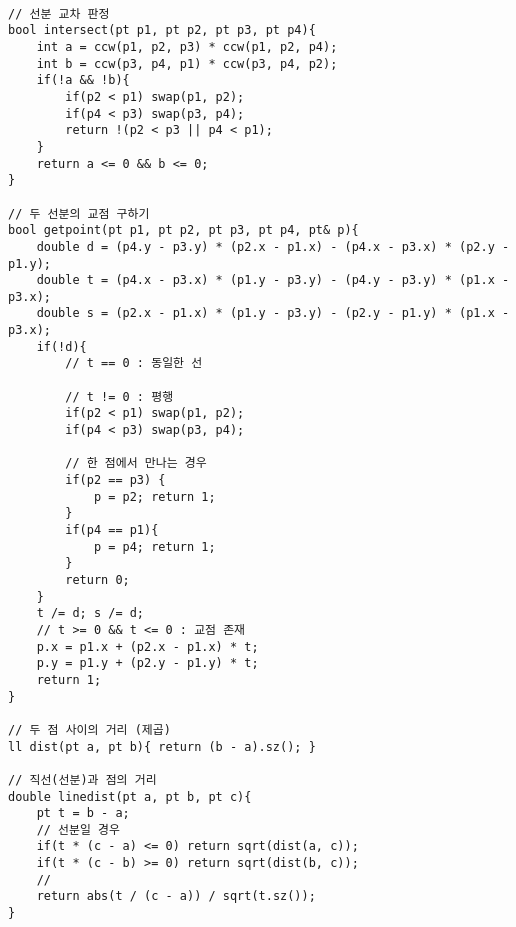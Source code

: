 \documentclass[landscape, 8pt, a4paper, oneside, twocolumn]{extarticle}
\begin{document}
\begin{verbatim}

// 선분 교차 판정
bool intersect(pt p1, pt p2, pt p3, pt p4){
    int a = ccw(p1, p2, p3) * ccw(p1, p2, p4);
    int b = ccw(p3, p4, p1) * ccw(p3, p4, p2);
    if(!a && !b){
        if(p2 < p1) swap(p1, p2);
        if(p4 < p3) swap(p3, p4);
        return !(p2 < p3 || p4 < p1);
    }
    return a <= 0 && b <= 0;
}

// 두 선분의 교점 구하기
bool getpoint(pt p1, pt p2, pt p3, pt p4, pt& p){
    double d = (p4.y - p3.y) * (p2.x - p1.x) - (p4.x - p3.x) * (p2.y - p1.y);
    double t = (p4.x - p3.x) * (p1.y - p3.y) - (p4.y - p3.y) * (p1.x - p3.x);
    double s = (p2.x - p1.x) * (p1.y - p3.y) - (p2.y - p1.y) * (p1.x - p3.x);
    if(!d){
        // t == 0 : 동일한 선
        
        // t != 0 : 평행
        if(p2 < p1) swap(p1, p2);
        if(p4 < p3) swap(p3, p4);
        
        // 한 점에서 만나는 경우
        if(p2 == p3) {
            p = p2; return 1;
        }    
        if(p4 == p1){
            p = p4; return 1;
        }
        return 0;
    }
    t /= d; s /= d;
    // t >= 0 && t <= 0 : 교점 존재
    p.x = p1.x + (p2.x - p1.x) * t;
    p.y = p1.y + (p2.y - p1.y) * t;
    return 1;
}

// 두 점 사이의 거리 (제곱)
ll dist(pt a, pt b){ return (b - a).sz(); }

// 직선(선분)과 점의 거리
double linedist(pt a, pt b, pt c){
    pt t = b - a;
    // 선분일 경우
    if(t * (c - a) <= 0) return sqrt(dist(a, c));
    if(t * (c - b) >= 0) return sqrt(dist(b, c));
    //   
    return abs(t / (c - a)) / sqrt(t.sz());
}


\end{verbatim}
\newpage
\end{document}
